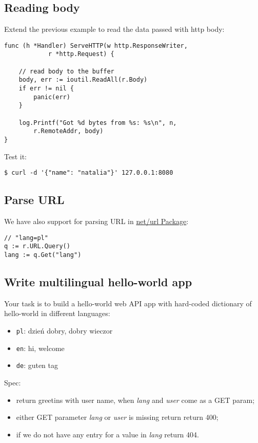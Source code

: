 \documentclass[11pt, letterpaper]{article}
\begin{document}
\subsection{Reading body}

Extend the previous example to read the data passed with http body:

\begin{verbatim}
func (h *Handler) ServeHTTP(w http.ResponseWriter,
			r *http.Request) {

	// read body to the buffer
	body, err := ioutil.ReadAll(r.Body)
	if err != nil {  
		panic(err)
	}

	log.Printf("Got %d bytes from %s: %s\n", n,
		r.RemoteAddr, body)
}
\end{verbatim}

Test it:

\begin{verbatim}
$ curl -d '{"name": "natalia"}' 127.0.0.1:8080 
\end{verbatim}

\subsection{Parse URL}

We have also support for parsing {\small URL} in \href{https://golang.org/pkg/net/url/}{net/url Package}:

\begin{verbatim}
// "lang=pl"
q := r.URL.Query()
lang := q.Get("lang")
\end{verbatim}

\subsection{Write multilingual hello-world app}

Your task is to build a hello-world web {\small API} app with hard-coded dictionary of hello-world in different languages: \begin{itemize}
\item \verb|pl|: dzień dobry, dobry wieczor
\item \verb|en|: hi, welcome
\item \verb|de|: guten tag
\end{itemize}

Spec:
\begin{itemize}
\item return greetins with user name, when \emph{lang} and \emph{user} come as a {\small GET} param;
\item either {\small GET} parameter \emph{lang} or \emph{user} is missing return return 400;
\item if we do not have any entry for a value in \emph{lang} return 404.
\end{itemize}
\end{document}
